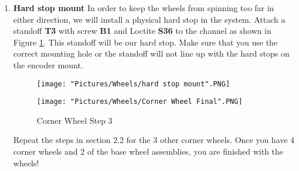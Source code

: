 \documentclass[12pt]{article}
\begin{document}
\begin{enumerate}
\item \textbf{Hard stop mount} In order to keep the wheels from spinning too far in either direction, we will install a physical hard stop in the system. Attach a standoff \textbf{T3} with screw \textbf{B1} and Loctite \textbf{S36} to the channel as shown in Figure \ref{corner wheel step 3}. This standoff will be our hard stop. Make sure that you use the correct mounting hole or the standoff will not line up with the hard stops on the encoder mount.

\begin{figure}[H]
  \centering
  \begin{minipage}[b]{0.45\textwidth}
    \texttt{[image: "Pictures/Wheels/hard stop mount".PNG]}
  \end{minipage}
  \hfill
  \begin{minipage}[b]{0.45\textwidth}
    \texttt{[image: "Pictures/Wheels/Corner Wheel Final".PNG]}
  \end{minipage}
  \caption{Corner Wheel Step 3}
  \label{corner wheel step 3}
\end{figure}

Repeat the steps in section 2.2 for the 3 other corner wheels.  Once you have 4 corner wheels and 2 of the base wheel assemblies, you are finished with the wheels!

\end{enumerate}
\end{document}
